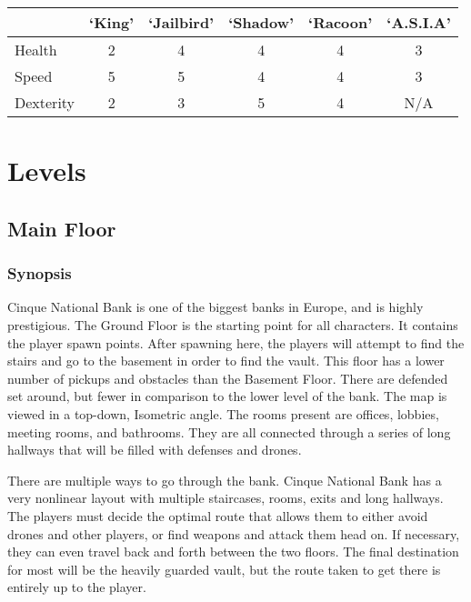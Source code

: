 \documentclass[10pt]{report}
\begin{document}
\begin{center}
    \begin{tabular}{|l|c|c|c|c|c|}
        \hline
                    & `King'        & `Jailbird'    & `Shadow'      & `Racoon'      & `A.S.I.A' \\ \hline
        Health      &  2            & 4             & 4             & 4             & 3         \\ \hline
        Speed       &  5            & 5             & 4             & 4             & 3         \\ \hline
        Dexterity   &  2            & 3             & 5             & 4             & N/A       \\ \hline
    \end{tabular}
\end{center}

\chapter{Levels}

\section{Main Floor}

\subsection{Synopsis}

Cinque National Bank is one of the biggest banks in Europe, and is highly prestigious. The Ground Floor is the starting point for all characters. It contains the player spawn points. After spawning here, the players will attempt to find the stairs and go to the basement in order to find the vault. This floor has a lower number of pickups and obstacles than the Basement Floor. There are defended set around, but fewer in comparison to the lower level of the bank. The map is viewed in a top-down, Isometric angle. The rooms present are offices, lobbies, meeting rooms, and bathrooms. They are all connected through a series of long hallways that will be filled with defenses and drones.

There are multiple ways to go through the bank. Cinque National Bank has a very nonlinear layout with multiple staircases, rooms, exits and long hallways. The players must decide the optimal route that allows them to either avoid drones and other players, or find weapons and attack them head on. If necessary, they can even travel back and forth between the two floors. The final destination for most will be the heavily guarded vault, but the route taken to get there is entirely up to the player. 
\end{document}
